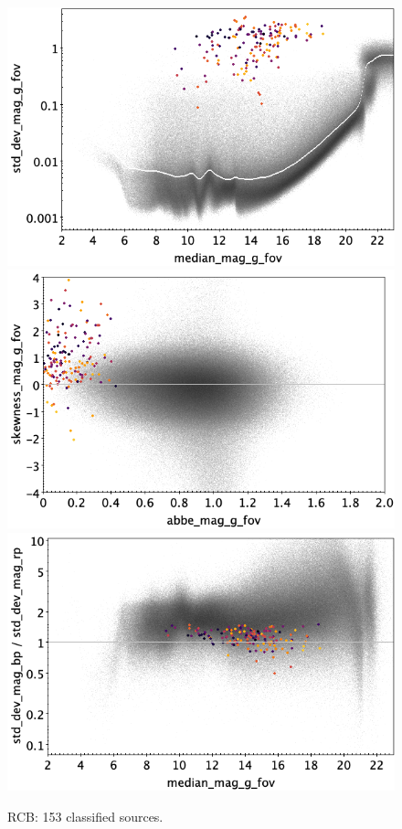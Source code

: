 \documentclass[longauth]{aa}
\begin{document}
\begin{appendix}
\begin{figure}
\hspace{2mm}
 \includegraphics[width=0.45\hsize]{figures/appendix/RCB_cls_msd.png} \\ %
\vspace{4mm}
 \includegraphics[width=0.45\hsize]{figures/appendix/RCB_cls_ask.png}  %
\hspace{2mm}
 \includegraphics[width=0.45\hsize]{figures/appendix/RCB_cls_msdr.png}  \\ %
\vspace{4mm}
 \caption{RCB: 153 classified sources.}  
 \label{fig:app:RCB}
\end{figure}


\end{appendix}
\end{document}
